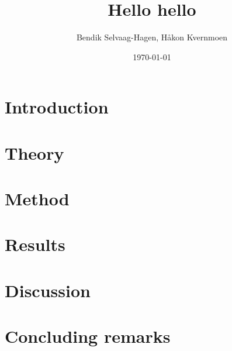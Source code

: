 \documentclass[twocolumn,english,notitlepage]{article}
\title{Hello hello}
\author{Bendik Selvaag-Hagen, Håkon Kvernmoen}
\date{\today}
\begin{document}


\section{Introduction}


\section{Theory}


\section{Method}


\section{Results}


\section{Discussion}


\section{Concluding remarks} 



\renewcommand{\theequation}{\thesection.\arabic{equation}}
\newpage
\begin{appendices}
     
\end{appendices}

\newpage

\end{document}
